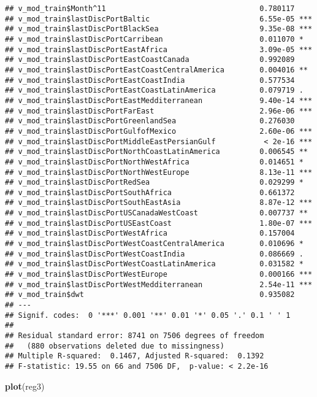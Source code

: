 \documentclass[]{article}
\newenvironment{Shaded}{\begin{snugshade}}{\end{snugshade}}
\newcommand{\KeywordTok}[1]{\textcolor[rgb]{0.13,0.29,0.53}{\textbf{#1}}}
\newcommand{\NormalTok}[1]{#1}
\begin{document}
\begin{verbatim}
## v_mod_train$Month^11                                   0.780117    
## v_mod_train$lastDiscPortBaltic                         6.55e-05 ***
## v_mod_train$lastDiscPortBlackSea                       9.35e-08 ***
## v_mod_train$lastDiscPortCarribean                      0.011070 *  
## v_mod_train$lastDiscPortEastAfrica                     3.09e-05 ***
## v_mod_train$lastDiscPortEastCoastCanada                0.992089    
## v_mod_train$lastDiscPortEastCoastCentralAmerica        0.004016 ** 
## v_mod_train$lastDiscPortEastCoastIndia                 0.577534    
## v_mod_train$lastDiscPortEastCoastLatinAmerica          0.079719 .  
## v_mod_train$lastDiscPortEastMedditerranean             9.40e-14 ***
## v_mod_train$lastDiscPortFarEast                        2.96e-06 ***
## v_mod_train$lastDiscPortGreenlandSea                   0.276030    
## v_mod_train$lastDiscPortGulfofMexico                   2.60e-06 ***
## v_mod_train$lastDiscPortMiddleEastPersianGulf           < 2e-16 ***
## v_mod_train$lastDiscPortNorthCoastLatinAmerica         0.006545 ** 
## v_mod_train$lastDiscPortNorthWestAfrica                0.014651 *  
## v_mod_train$lastDiscPortNorthWestEurope                8.13e-11 ***
## v_mod_train$lastDiscPortRedSea                         0.029299 *  
## v_mod_train$lastDiscPortSouthAfrica                    0.661372    
## v_mod_train$lastDiscPortSouthEastAsia                  8.87e-12 ***
## v_mod_train$lastDiscPortUSCanadaWestCoast              0.007737 ** 
## v_mod_train$lastDiscPortUSEastCoast                    1.80e-07 ***
## v_mod_train$lastDiscPortWestAfrica                     0.157004    
## v_mod_train$lastDiscPortWestCoastCentralAmerica        0.010696 *  
## v_mod_train$lastDiscPortWestCoastIndia                 0.086669 .  
## v_mod_train$lastDiscPortWestCoastLatinAmerica          0.031582 *  
## v_mod_train$lastDiscPortWestEurope                     0.000166 ***
## v_mod_train$lastDiscPortWestMedditerranean             2.54e-11 ***
## v_mod_train$dwt                                        0.935082    
## ---
## Signif. codes:  0 '***' 0.001 '**' 0.01 '*' 0.05 '.' 0.1 ' ' 1
## 
## Residual standard error: 8741 on 7506 degrees of freedom
##   (880 observations deleted due to missingness)
## Multiple R-squared:  0.1467, Adjusted R-squared:  0.1392 
## F-statistic: 19.55 on 66 and 7506 DF,  p-value: < 2.2e-16
\end{verbatim}

\begin{Shaded}
\begin{Highlighting}[]
\KeywordTok{plot}\NormalTok{(reg3)}
\end{Highlighting}
\end{Shaded}
\end{document}

